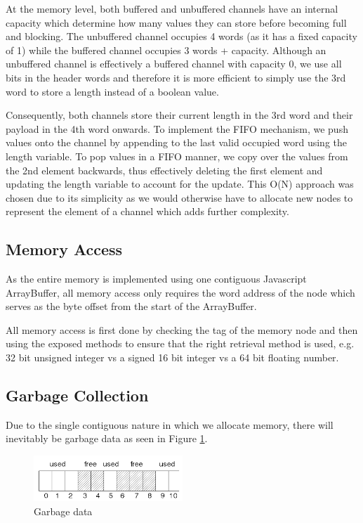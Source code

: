 \documentclass{report}
\begin{document}
At the memory level, both buffered and unbuffered channels have an internal capacity which determine how many values they can store before becoming full and blocking. The unbuffered channel occupies 4 words (as it has a fixed capacity of 1) while the buffered channel occupies 3 words + capacity. Although an unbuffered channel is effectively a buffered channel with capacity 0, we use all bits in the header words and therefore it is more efficient to simply use the 3rd word to store a length instead of a boolean value. 

Consequently, both channels store their current length in the 3rd word and their payload in the 4th word onwards. To implement the FIFO mechanism, we push values onto the channel by appending to the last valid occupied word using the length variable. To pop values in a FIFO manner, we copy over the values from the 2nd element backwards, thus effectively deleting the first element and updating the length variable to account for the update. This O(N) approach was chosen due to its simplicity as we would otherwise have to allocate new nodes to represent the element of a channel which adds further complexity.

\subsection{Memory Access}

As the entire memory is implemented using one contiguous Javascript ArrayBuffer, all memory access only requires the word address of the node which serves as the byte offset from the start of the ArrayBuffer.

All memory access is first done by checking the tag of the memory node and then using the exposed methods to ensure that the right retrieval method is used, e.g. 32 bit unsigned integer vs a signed 16 bit integer vs a 64 bit floating number.

\subsection{Garbage Collection}

Due to the single contiguous nature in which we allocate memory, there will inevitably be garbage data as seen in Figure \ref{fig:garbage-data}.

\begin{figure}
    \centering
    \includegraphics[width=0.5\textwidth]{memory-compaction.png}
    \caption{Garbage data}
    \label{fig:garbage-data}
\end{figure}
\end{document}
